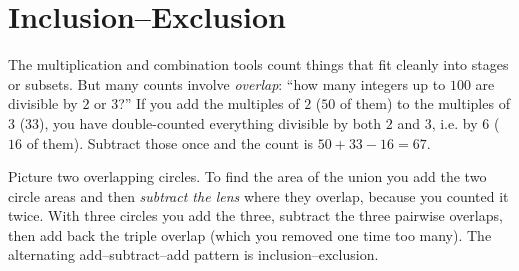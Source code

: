 \section{Inclusion--Exclusion}
\label{ch2:incexc}

The multiplication and combination tools count things that fit cleanly into stages or
subsets. But many counts involve \emph{overlap}: ``how many integers up to $100$ are
divisible by $2$ or $3$?'' If you add the multiples of $2$ ($50$ of them) to the multiples
of $3$ ($33$), you have double-counted everything divisible by both $2$ and $3$, i.e. by
$6$ ($16$ of them). Subtract those once and the count is $50 + 33 - 16 = 67$.

\begin{intuitionbox}
Picture two overlapping circles. To find the area of the union you add the two circle areas
and then \emph{subtract the lens} where they overlap, because you counted it twice. With
three circles you add the three, subtract the three pairwise overlaps, then add back the
triple overlap (which you removed one time too many). The alternating add--subtract--add
pattern is inclusion--exclusion.
\end{intuitionbox}

